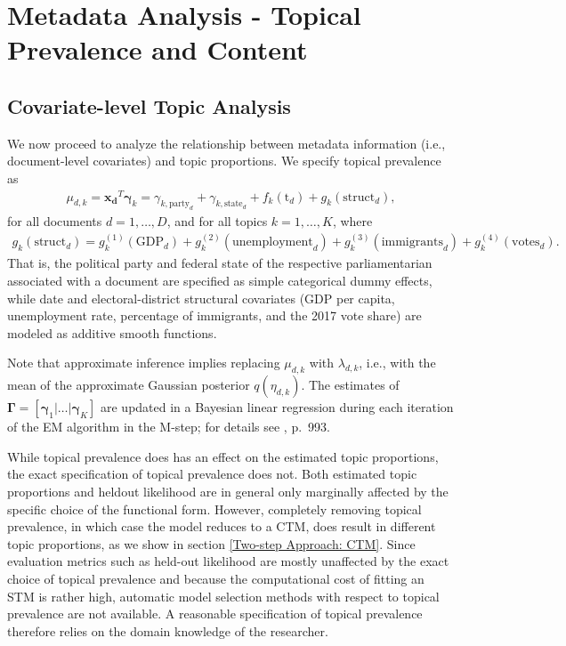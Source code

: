 \section{Metadata Analysis - Topical Prevalence and Content}
\label{Metadata Analysis - Topical Prevalence and Content}

\subsection{Covariate-level Topic Analysis}
\label{Covariate-level Topic Analysis}

We now proceed to analyze the relationship between metadata information (i.e., document-level covariates) and topic proportions. We specify topical prevalence as 
\begin{align}
\mu_{d,k} = \boldsymbol{x_d}^T \boldsymbol{\gamma}_k= \gamma_{k,\text{party}_d} + \gamma_{k,\text{state}_d} + f_k(\text{t}_d) + g_k(\text{struct}_d), \label{prevalence}
\end{align} 
for all documents $d = 1,\dots,D$, and for all topics $k = 1,\dots,K$, where 
\begin{align*}
g_k(\text{struct}_d) = g_{k}^{(1)}(\text{GDP}_d)+g_{k}^{(2)}(\text{unemployment}_d)+g_{k}^{(3)}(\text{immigrants}_d)+g_{k}^{(4)}(\text{votes}_d). 
\end{align*} 
That is, the political party and federal state of the respective parliamentarian associated with a document are specified as simple categorical dummy effects, while date and electoral-district structural covariates (GDP per capita, unemployment rate, percentage of immigrants, and the 2017 vote share) are modeled as additive smooth functions.

Note that approximate inference implies replacing $\mu_{d,k}$ with $\lambda_{d,k}$, i.e., with the mean of the approximate Gaussian posterior $q(\eta_{d,k})$. The estimates of $\boldsymbol{\Gamma} = [\boldsymbol{\gamma}_1 | \dots | \boldsymbol{\gamma}_K]$ are updated in a Bayesian linear regression during each iteration of the EM algorithm in the M-step; for details see \cite{roberts2013structural}, p.\ 993.

While topical prevalence does has an effect on the estimated topic proportions, the exact specification of topical prevalence does not. Both estimated topic proportions and heldout likelihood are in general only marginally affected by the specific choice of the functional form. However, completely removing topical prevalence, in which case the model reduces to a CTM, does result in different topic proportions, as we show in section \ref{Two-step Approach: CTM}. Since evaluation metrics such as held-out likelihood are mostly unaffected by the exact choice of topical prevalence and because the computational cost of fitting an STM is rather high, automatic model selection methods with respect to topical prevalence are not available. A reasonable specification of topical prevalence therefore relies on the domain knowledge of the researcher.

